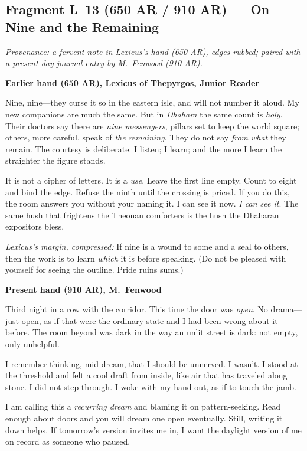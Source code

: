 \documentclass[11pt]{article}
\begin{document}
\subsection*{Fragment L--13 (650 AR / 910 AR) --- On Nine and the Remaining}
\label{frag:l13}
{}

\noindent\textit{Provenance: a fervent note in Lexicus’s hand (650 AR), edges rubbed; paired with a present-day journal entry by M.\ Fenwood (910 AR).}

\medskip
\noindent\textbf{Earlier hand (650 AR), Lexicus of Thepyrgos, Junior Reader}

Nine, nine—they curse it so in the eastern isle, and will not number it aloud. My new companions are much the same. But in \textit{Dhahara} the same count is \emph{holy}. Their doctors say there are \emph{nine messengers}, pillars set to keep the world square; others, more careful, speak of \emph{the remaining}. They do not say \emph{from what} they remain. The courtesy is deliberate. I listen; I learn; and the more I learn the straighter the figure stands.

It is not a cipher of letters. It is a \emph{use}. Leave the first line empty. Count to eight and bind the edge. Refuse the ninth until the crossing is priced. If you do this, the room answers you without your naming it. I can see it now. \emph{I can see it}. The same hush that frightens the Theonan comforters is the hush the Dhaharan expositors bless.

\medskip
\noindent\textit{Lexicus’s margin, compressed:} If nine is a wound to some and a seal to others, then the work is to learn \emph{which} it is before speaking. (Do not be pleased with yourself for seeing the outline. Pride ruins sums.)

\medskip
\noindent\textbf{Present hand (910 AR), M.\ Fenwood}

Third night in a row with the corridor. This time the door was \emph{open}. No drama—just open, as if that were the ordinary state and I had been wrong about it before. The room beyond was dark in the way an unlit street is dark: not empty, only unhelpful.

I remember thinking, mid-dream, that I should be unnerved. I wasn’t. I stood at the threshold and felt a cool draft from inside, like air that has traveled along stone. I did not step through. I woke with my hand out, as if to touch the jamb.

I am calling this a \emph{recurring dream} and blaming it on pattern-seeking. Read enough about doors and you will dream one open eventually. Still, writing it down helps. If tomorrow’s version invites me in, I want the daylight version of me on record as someone who paused.
\end{document}
